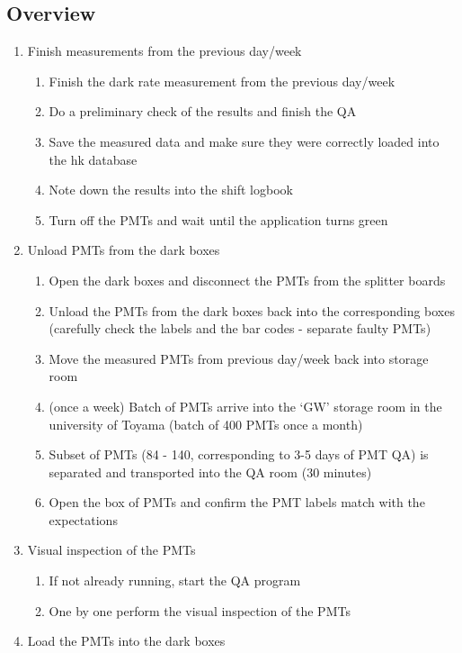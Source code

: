 \documentclass[12pt,a4paper]{article}
\begin{document}
\subsection{Overview}
\begin{enumerate}
    \item Finish measurements from the previous day/week
    \begin{enumerate}
      \item Finish the dark rate measurement from the previous day/week
      \item Do a preliminary check of the results and finish the QA
      \item Save the measured data and make sure they were correctly loaded into the hk database
      \item Note down the results into the shift logbook
      \item Turn off the PMTs and wait until the application turns green 
    \end{enumerate}
    \item Unload PMTs from the dark boxes
    \begin{enumerate}
      \item Open the dark boxes and disconnect the PMTs from the splitter boards
      \item Unload the PMTs from the dark boxes back into the corresponding boxes (carefully check the labels and the bar codes - separate faulty PMTs)
      \item Move the measured PMTs from previous day/week back into storage room
      \item (once a week) Batch of PMTs arrive into the `GW' storage room in the university of Toyama (batch of 400 PMTs once a month)
      \item Subset of PMTs (84 - 140, corresponding to 3-5 days of PMT QA) is separated and transported into the QA room (30 minutes)
      \item Open the box of PMTs and confirm the PMT labels match with the expectations
    \end{enumerate}
    \item Visual inspection of the PMTs
    \begin{enumerate}
      \item If not already running, start the QA program
      \item One by one perform the visual inspection of the PMTs
    \end{enumerate}
    \item Load the PMTs into the dark boxes

\end{enumerate}
\end{document}
